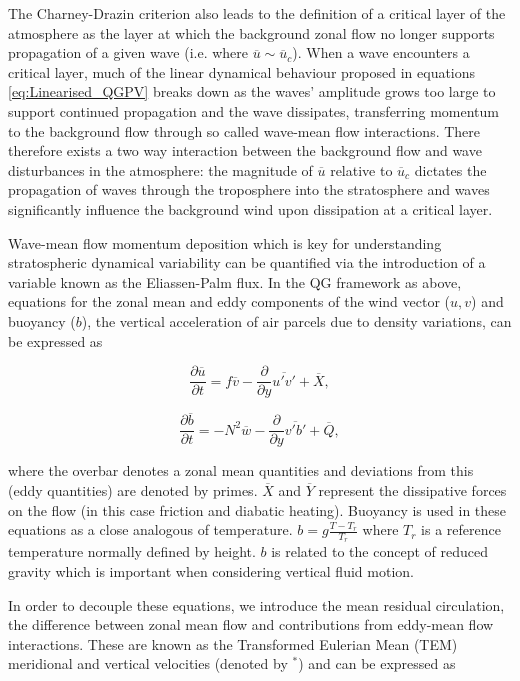The Charney-Drazin criterion also leads to the definition of a critical layer of the atmosphere as the layer at which the background zonal flow no longer supports propagation of a given wave (i.e. where $\overline{u} \sim \overline{u}_c$). When a wave encounters a critical layer, much of the linear dynamical behaviour proposed in equations \ref{eq:Linearised_QGPV} breaks down as the waves' amplitude grows too large to support continued propagation and the wave dissipates, transferring momentum to the background flow through so called wave-mean flow interactions. There therefore exists a two way interaction between the background flow and wave disturbances in the atmosphere: the magnitude of $\overline{u}$ relative to $\overline{u}_c$ dictates the propagation of waves through the troposphere into the stratosphere and waves significantly influence the background wind upon dissipation at a critical layer.

Wave-mean flow momentum deposition which is key for understanding stratospheric dynamical variability can be quantified via the introduction of a variable known as the Eliassen-Palm flux. In the QG framework as above, equations for the zonal mean and eddy components of the wind vector ($u, v$) and buoyancy ($b$), the vertical acceleration of air parcels due to density variations, can be expressed as 

\begin{equation} \label{eq:QG_Ubar}
\frac{\partial \overline{u}}{\partial t} = f\overline{v} - \frac{\partial}{\partial y} \overline{u'v'} + \overline{X}, 
\end{equation}

\begin{equation} \label{eq:QG_theta}
\frac{\partial \overline{b}}{\partial t} = -N^2\overline{w} - \frac{\partial}{\partial y} \overline{v'b'} + \overline{Q}, 
\end{equation}

where the overbar denotes a zonal mean quantities and deviations from this (eddy quantities) are denoted by primes. $\overline{X}$ and $\overline{Y}$ represent the dissipative forces on the flow (in this case friction and diabatic heating). Buoyancy is used in these equations as a close analogous of temperature. $b = g\frac{T - T_r}{T_r}$ where $T_r$ is a reference temperature normally defined by height. $b$ is related to the concept of reduced gravity which is important when considering vertical fluid motion. 

In order to decouple these equations, we introduce the mean residual circulation, the difference between zonal mean flow and contributions from eddy-mean flow interactions. These are known as the Transformed Eulerian Mean (TEM) meridional and vertical velocities \citep{Andrews1976} (denoted by $^*$) and can be expressed as 

